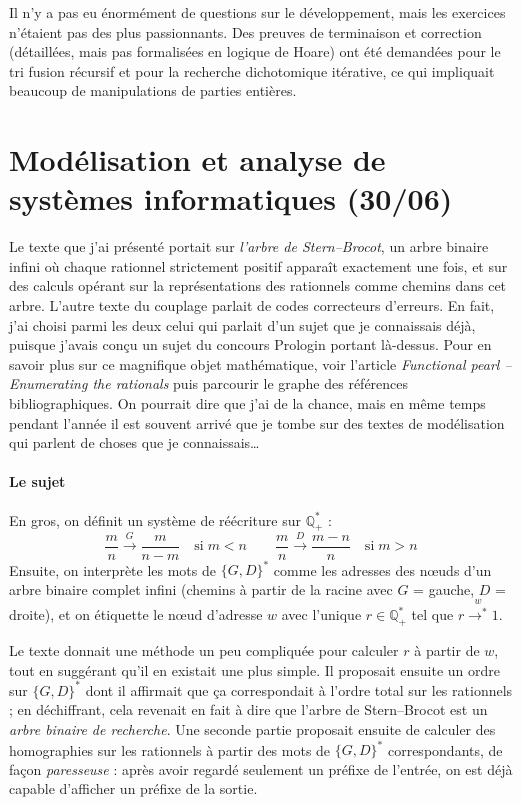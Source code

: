 \documentclass[a4paper, 11pt]{article}
\begin{document}
Il n'y a pas eu énormément de questions sur le développement, mais les exercices
n'étaient pas des plus passionnants. Des preuves de terminaison et correction
(détaillées, mais pas formalisées en logique de Hoare) ont été demandées pour le
tri fusion récursif et pour la recherche dichotomique itérative, ce qui
impliquait beaucoup de manipulations de parties entières.

\newpage

\section*{Modélisation et analyse de systèmes informatiques (30/06)}

Le texte que j'ai présenté portait sur \emph{l'arbre de Stern--Brocot}, un arbre
binaire infini où chaque rationnel strictement positif apparaît exactement une
fois, et sur des calculs opérant sur la représentations des rationnels comme
chemins dans cet arbre. L'autre texte du couplage parlait de codes correcteurs
d'erreurs. En fait, j'ai choisi parmi les deux celui qui parlait d'un sujet que
je connaissais déjà, puisque j'avais conçu un sujet du concours Prologin portant
là-dessus. Pour en savoir plus sur ce magnifique objet mathématique, voir
l'article \emph{Functional pearl -- Enumerating the rationals} puis parcourir
le graphe des références bibliographiques. On pourrait dire que j'ai de la
chance, mais en même temps pendant l'année il est souvent arrivé que je tombe
sur des textes de modélisation qui parlent de choses que je connaissais…

\paragraph{Le sujet}

En gros, on définit un système de réécriture sur $\mathbb{Q}_+^*$ :
\[ \frac{m}{n} \xrightarrow{G} \frac{m}{n-m} \quad \text{si}\; m < n
 \qquad \frac{m}{n} \xrightarrow{D} \frac{m-n}{n} \quad \text{si}\; m > n \]
Ensuite, on interprète les mots de $\{G,D\}^*$ comme les adresses des nœuds d'un
arbre binaire complet infini (chemins à partir de la racine avec $G$ = gauche,
$D$ = droite), et on étiquette le nœud d'adresse $w$ avec l'unique $r \in
\mathbb{Q}_+^*$  tel que $r \overset{w}{\longrightarrow^*} 1$.

Le texte donnait une méthode un peu compliquée pour calculer $r$ à partir de
$w$, tout en suggérant qu'il en existait une plus simple. Il proposait ensuite
un ordre sur $\{G,D\}^*$ dont il affirmait que ça correspondait à l'ordre total
sur les rationnels ; en déchiffrant, cela revenait en fait à dire que l'arbre de
Stern--Brocot est un \emph{arbre binaire de recherche}. Une seconde partie
proposait ensuite de calculer des homographies sur les rationnels à partir des
mots de $\{G,D\}^*$ correspondants, de façon \emph{paresseuse} : après avoir
regardé seulement un préfixe de l'entrée, on est déjà capable d'afficher un
préfixe de la sortie.
\end{document}
